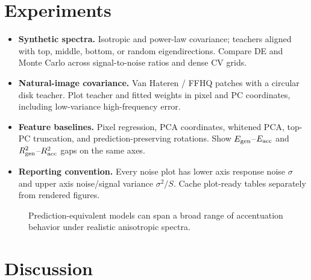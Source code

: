 \documentclass{article}
\newcommand{\Egen}{E_{\rm gen}}
\newcommand{\Eacc}{E_{\rm acc}}
\newcommand{\Rgen}{R_{\rm gen}^{2}}
\newcommand{\Racc}{R_{\rm acc}^{2}}
\begin{document}
\section{Experiments}
\label{sec:experiments}
\begin{itemize}[leftmargin=1.3em]
  \item \textbf{Synthetic spectra.} Isotropic and power-law covariance;
        teachers aligned with top, middle, bottom, or random eigendirections.
        Compare DE and Monte Carlo across signal-to-noise ratios and dense CV
        grids.
  \item \textbf{Natural-image covariance.} Van Hateren / FFHQ patches with a
        circular disk teacher. Plot teacher and fitted weights in pixel and PC
        coordinates, including low-variance high-frequency error.
  \item \textbf{Feature baselines.} Pixel regression, PCA coordinates,
        whitened PCA, top-PC truncation, and prediction-preserving rotations.
        Show $\Egen$--$\Eacc$ and $\Rgen$--$\Racc$ gaps on the same axes.
  \item \textbf{Reporting convention.} Every noise plot has lower axis
        response noise $\sigma$ and upper axis noise/signal variance
        $\sigma^2/S$. Cache plot-ready tables separately from rendered figures.
\end{itemize}

\begin{figure}[t]
  \centering
  \caption{Prediction-equivalent models can span a broad range of
  accentuation behavior under realistic anisotropic spectra.}
  \label{fig:experiments}
\end{figure}

\section{Discussion}
\end{document}
